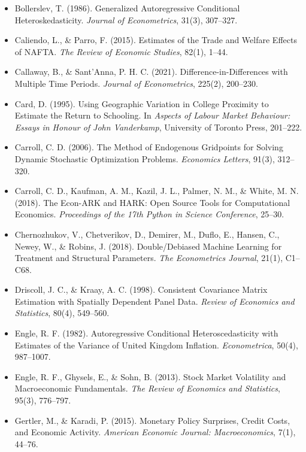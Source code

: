 \documentclass[11pt,letterpaper]{article}
\renewcommand{\_}{\pmunderscore\allowbreak}
\begin{document}
\begin{itemize}
  Blundell, R., \& Bond, S. (1998). Initial Conditions and Moment Restrictions in Dynamic Panel Data Models. \emph{Journal of Econometrics}, 87(1), 115--143.
\item
  Bollerslev, T. (1986). Generalized Autoregressive Conditional Heteroskedasticity. \emph{Journal of Econometrics}, 31(3), 307--327.
\item
  Caliendo, L., \& Parro, F. (2015). Estimates of the Trade and Welfare Effects of NAFTA. \emph{The Review of Economic Studies}, 82(1), 1--44.
\item
  Callaway, B., \& Sant'Anna, P. H. C. (2021). Difference-in-Differences with Multiple Time Periods. \emph{Journal of Econometrics}, 225(2), 200--230.
\item
  Card, D. (1995). Using Geographic Variation in College Proximity to Estimate the Return to Schooling. In \emph{Aspects of Labour Market Behaviour: Essays in Honour of John Vanderkamp}, University of Toronto Press, 201--222.
\item
  Carroll, C. D. (2006). The Method of Endogenous Gridpoints for Solving Dynamic Stochastic Optimization Problems. \emph{Economics Letters}, 91(3), 312--320.
\item
  Carroll, C. D., Kaufman, A. M., Kazil, J. L., Palmer, N. M., \& White, M. N. (2018). The Econ-ARK and HARK: Open Source Tools for Computational Economics. \emph{Proceedings of the 17th Python in Science Conference}, 25--30.
\item
  Chernozhukov, V., Chetverikov, D., Demirer, M., Duflo, E., Hansen, C., Newey, W., \& Robins, J. (2018). Double/Debiased Machine Learning for Treatment and Structural Parameters. \emph{The Econometrics Journal}, 21(1), C1--C68.
\item
  Driscoll, J. C., \& Kraay, A. C. (1998). Consistent Covariance Matrix Estimation with Spatially Dependent Panel Data. \emph{Review of Economics and Statistics}, 80(4), 549--560.
\item
  Engle, R. F. (1982). Autoregressive Conditional Heteroscedasticity with Estimates of the Variance of United Kingdom Inflation. \emph{Econometrica}, 50(4), 987--1007.
\item
  Engle, R. F., Ghysels, E., \& Sohn, B. (2013). Stock Market Volatility and Macroeconomic Fundamentals. \emph{The Review of Economics and Statistics}, 95(3), 776--797.
\item
  Gertler, M., \& Karadi, P. (2015). Monetary Policy Surprises, Credit Costs, and Economic Activity. \emph{American Economic Journal: Macroeconomics}, 7(1), 44--76.

\end{itemize}
\end{document}
